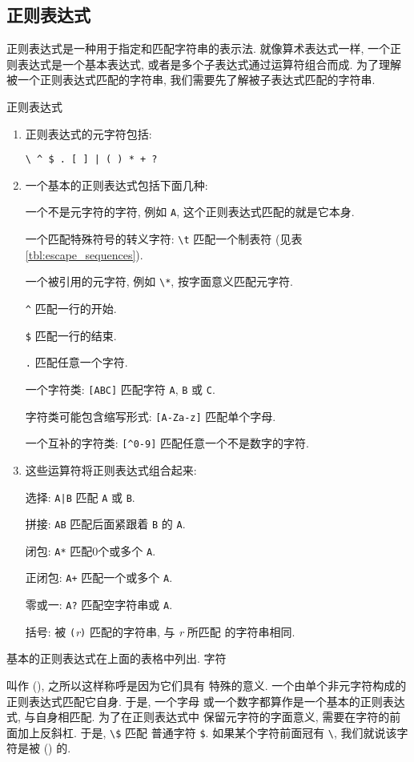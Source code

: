 \subsection{正则表达式}
\label{subsec:regular_expressions}
正则表达式是一种用于指定和匹配字符串的表示法. 就像算术表达式一样,
一个正则表达式是一个基本表达式, 或者是多个子表达式通过运算符组合而成.
为了理解被一个正则表达式匹配的字符串, 我们需要先了解被子表达式匹配的字符串.
\begin{summary}{正则表达式}
\begin{enumerate}
\item 正则表达式的元字符包括: \par
    \verb'\ ^ $ . [ ] | ( ) * + ?'
\item 一个基本的正则表达式包括下面几种: \par
    一个不是元字符的字符, 例如 \verb'A', 这个正则表达式匹配的就是它本身. \par
    一个匹配特殊符号的转义字符: \verb'\t' 匹配一个制表符 (见表
    \ref{tbl:escape_sequences}). \par
    一个被引用的元字符, 例如 \verb'\*', 按字面意义匹配元字符. \par
    \verb'^' 匹配一行的开始. \par
    \verb'$' 匹配一行的结束. \par
    \verb'.' 匹配任意一个字符. \par
    一个字符类: \verb'[ABC]' 匹配字符 \verb'A', \verb'B' 或 \verb'C'. \par
    字符类可能包含缩写形式: \verb'[A-Za-z]' 匹配单个字母. \par
    一个互补的字符类: \verb'[^0-9]' 匹配任意一个不是数字的字符.
\item 这些运算符将正则表达式组合起来:   \par
    选择: \verb'A|B' 匹配 \verb'A' 或 \verb'B'. \par
    拼接: \verb'AB' 匹配后面紧跟着 \verb'B' 的 \verb'A'. \par
    闭包: \verb'A*' 匹配0个或多个 \verb'A'. \par
    正闭包: \verb'A+' 匹配一个或多个 \verb'A'. \par
    零或一: \verb'A?' 匹配空字符串或 \verb'A'. \par
    括号: 被 \verb'('\textit{r}\verb')' 匹配的字符串, 与 \textit{r} 所匹配 
    的字符串相同.
\end{enumerate}
\end{summary}

基本的正则表达式在上面的表格中列出. 字符
叫作  (), 之所以这样称呼是因为它们具有
特殊的意义. 一个由单个非元字符构成的正则表达式匹配它自身. 于是, 一个字母
或一个数字都算作是一个基本的正则表达式, 与自身相匹配.  为了在正则表达式中
保留元字符的字面意义, 需要在字符的前面加上反斜杠. 于是, \verb'\$' 匹配
普通字符 \verb'$'. 如果某个字符前面冠有 \verb'\', 我们就说该字符是被
 () 的.

